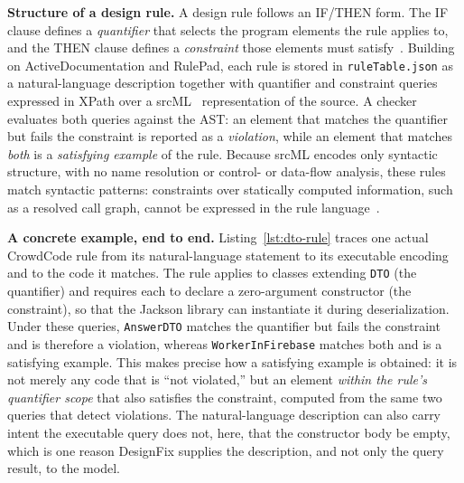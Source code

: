 \textbf{Structure of a design rule.} A design rule follows an IF/THEN
form. The IF clause defines a \emph{quantifier} that selects the program
elements the rule applies to, and the THEN clause defines a
\emph{constraint} those elements must satisfy~\cite{mehrpour2019active,
mehrpour2020rulepad}. Building on ActiveDocumentation and RulePad, each
rule is stored in \texttt{ruleTable.json} as a natural-language
description together with quantifier and constraint queries expressed in
XPath over a srcML~\cite{collard2013srcml} representation of the source.
A checker evaluates both queries against the AST: an element that
matches the quantifier but fails the constraint is reported as a
\emph{violation}, while an element that matches \emph{both} is a
\emph{satisfying example} of the rule. Because srcML encodes only syntactic structure, with no name resolution or control- or data-flow analysis, these rules match syntactic patterns: constraints over statically computed information, such as a resolved call graph, cannot be expressed in the rule
language~\cite{collard2013srcml,mehrpour2020rulepad}.


\textbf{A concrete example, end to end.} Listing~\ref{lst:dto-rule} traces
one actual CrowdCode rule from its natural-language statement to its
executable encoding and to the code it matches. The rule applies to
classes extending \texttt{DTO} (the quantifier) and requires each to
declare a zero-argument constructor (the constraint), so that the
Jackson library can instantiate it during deserialization. Under these
queries, \texttt{AnswerDTO} matches the quantifier but fails the
constraint and is therefore a violation, whereas \texttt{WorkerInFirebase}
matches both and is a satisfying example. This makes precise how a
satisfying example is obtained: it is not merely any code that is ``not
violated,'' but an element \emph{within the rule's quantifier scope}
that also satisfies the constraint, computed from the same two queries
that detect violations. The natural-language description can also carry
intent the executable query does not, here, that the constructor body be
empty, which is one reason DesignFix supplies the description, and not
only the query result, to the model.

